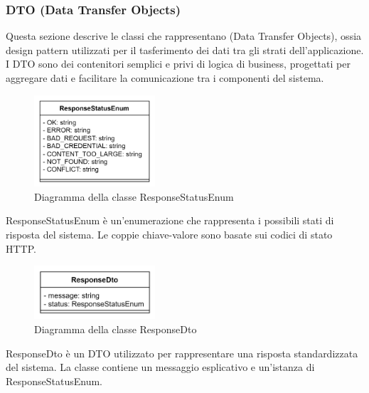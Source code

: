 \subsubsection{DTO (Data Transfer Objects)}

\par Questa sezione descrive le classi che rappresentano  (Data Transfer Objects), ossia design pattern utilizzati per il tasferimento dei dati tra gli strati dell'applicazione. I DTO sono dei contenitori semplici e privi di logica di business, progettati per aggregare dati e facilitare la comunicazione tra i componenti del sistema.

 \label{ResponseStatusEnum} 
\begin{figure}[H]
    \centering
    \includegraphics[width=0.4\textwidth]{assets/Backend/response_status_enum.png}
    \caption{Diagramma della classe ResponseStatusEnum}
\end{figure}
\par ResponseStatusEnum è un'enumerazione che rappresenta i possibili stati di risposta del sistema. Le coppie chiave-valore sono basate sui codici di stato HTTP.

 \label{ResponseDto}
\begin{figure}[H]
    \centering
    \includegraphics[width=0.4\textwidth]{assets/Backend/response_dto.png}
    \caption{Diagramma della classe ResponseDto}
  \end{figure}
\par ResponseDto è un DTO utilizzato per rappresentare una risposta standardizzata del sistema. La classe contiene un messaggio esplicativo e un'istanza di ResponseStatusEnum.

